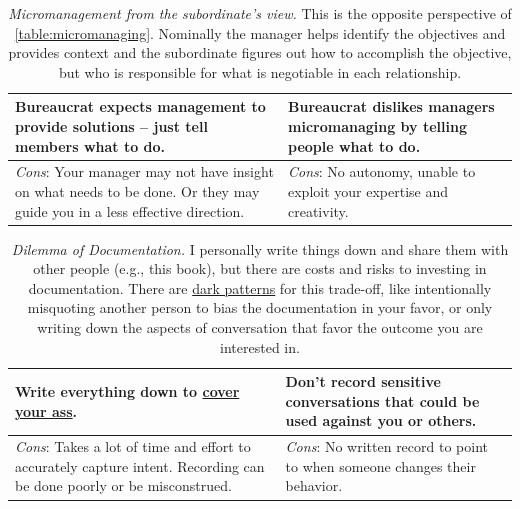 \begin{center}
\begin{table}[H] %
\begin{tabular}{ | m{\dilemmatablewidth}| m{\dilemmatablewidth} | } 
  \hline
  \textbf{Bureaucrat expects management to provide solutions -- just tell members what to do.} & 
  \textbf{Bureaucrat dislikes managers micromanaging by telling people what to do.} \\ 
  \hline
  \textit{Cons}: Your manager may not have insight on what needs to be done. Or they may guide you in a less effective direction. &
  \textit{Cons}: No autonomy, unable to exploit your expertise and creativity. \\  
  \hline
\end{tabular}
\caption{\textit{Micromanagement from the subordinate's view.}
This is the opposite perspective of \ref{table:micromanaging}. Nominally the manager helps identify the objectives and provides context and the subordinate figures out how to accomplish the objective, but who is responsible for what is negotiable in each relationship.
}
\label{table:solution_provider}
\end{table}
\end{center}


\begin{center}
\begin{table}[H] %
\begin{tabular}{ | m{\dilemmatablewidth}| m{\dilemmatablewidth} | } 
  \hline
  \textbf{Write everything down to \href{https://en.wikipedia.org/wiki/Cover_your_ass}{cover your ass}.} &
  \textbf{Don't record sensitive conversations that could be used against you or others.} \\
  \hline
  \textit{Cons}: Takes a lot of time and effort to accurately capture intent. Recording can be done poorly or be misconstrued.  & 
  \textit{Cons}: No written record to point to when someone changes their behavior. \\
  \hline
\end{tabular}
\caption{\textit{Dilemma of Documentation.}
I personally write things down and share them with other people (e.g., this book), but there are costs and risks to investing in documentation. There are \href{https://en.wikipedia.org/wiki/Dark_pattern}{dark patterns} for this trade-off, like intentionally misquoting another person to bias the documentation in your favor, or only writing down the aspects of conversation that favor the outcome you are interested in.}
\label{table:notes_or_no_notes}
\end{table}
\end{center}


